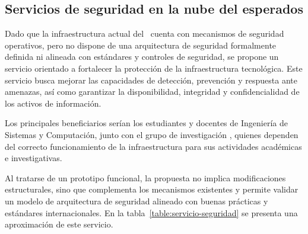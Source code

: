 \subsection{Servicios de seguridad en la nube del \GRID esperados}
\noindent
Dado que la infraestructura actual del \GRID\ cuenta con mecanismos de seguridad operativos, pero no dispone de una arquitectura de 
seguridad formalmente definida ni alineada con estándares y controles de seguridad, se propone un servicio orientado a fortalecer la 
protección de la infraestructura tecnológica. Este servicio busca mejorar las capacidades de detección, prevención y respuesta ante 
amenazas, así como garantizar la disponibilidad, integridad y confidencialidad de los activos de información.

Los principales beneficiarios serían los estudiantes y docentes de Ingeniería de Sistemas y Computación, junto con el grupo de 
investigación \GRID, quienes dependen del correcto funcionamiento de la infraestructura para sus actividades académicas e investigativas.

Al tratarse de un prototipo funcional, la propuesta no implica modificaciones estructurales, sino que complementa los mecanismos 
existentes y permite validar un modelo de arquitectura de seguridad alineado con buenas prácticas y estándares internacionales. En la 
tabla~\ref{table:servicio-seguridad} se presenta una aproximación de este servicio.

